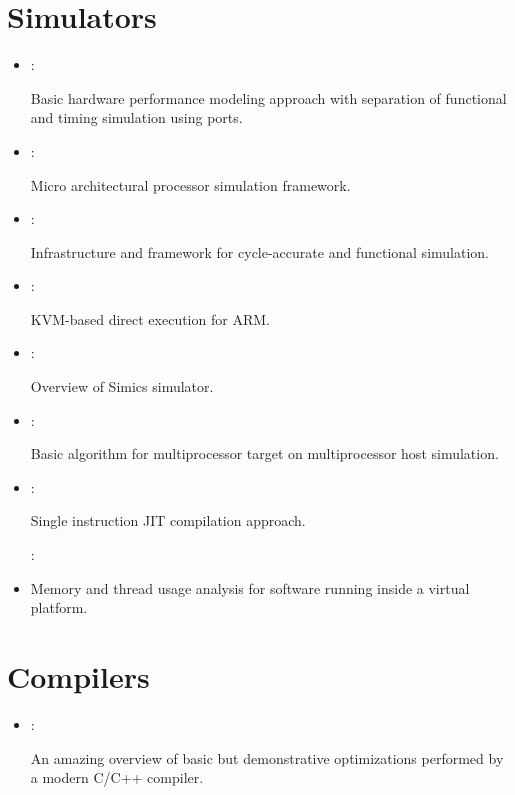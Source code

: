 \section*{Simulators}
\begin{itemize}
    \item \cite{Emer:Asim:2002}:

    Basic hardware performance modeling approach with separation of functional and timing simulation using ports.

    \item \cite{Hughes:Rsim:2002}:

    Micro architectural processor simulation framework.

    \item \cite{Austin:SimpleScalar:2002}:

    Infrastructure and framework for cycle-accurate and functional simulation.

    \item \cite{Junger:ARM-on-ARM:2020}:

    KVM-based direct execution for ARM.

    \item \cite{Magnusson:Simics:2002}:

    Overview of Simics simulator.

    \item \cite{Kenney:MP-on-MP:2015}:

    Basic algorithm for multiprocessor target on multiprocessor host simulation.

    \item \cite{Nohl:JIT-Simulation:2002}:

    Single instruction JIT compilation approach.

    \cite{Dahl:VP-Sanitizer:2018}:

    \item Memory and thread usage analysis for software running inside a virtual platform.
\end{itemize}

\section*{Compilers}
\begin{itemize}
    \item \cite{Godbolt:Optimizations:2020}:

    An amazing overview of basic but demonstrative optimizations performed by a modern C/C++ compiler.
\end{itemize}

